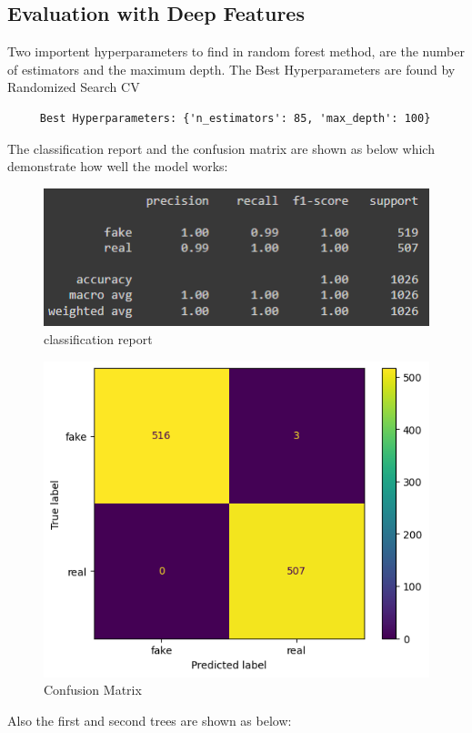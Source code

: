\documentclass{template}
\begin{document}
\subsection{Evaluation with Deep Features}
Two importent hyperparameters to find in random forest method, are the number of estimators and the maximum depth. The Best Hyperparameters are found by Randomized Search CV
\begin{verbatim}
     Best Hyperparameters: {'n_estimators': 85, 'max_depth': 100}
\end{verbatim}
The classification report and the confusion matrix are shown as below which demonstrate how well the model works:
\begin{figure}
\includegraphics[scale=0.7]{RF1.png}
\caption{classification report}
\label{fig:logo}
\end{figure}
\begin{figure}
\includegraphics[scale=0.7]{RF2.png}
\caption{ Confusion Matrix}
\label{fig:logo}
\end{figure}
Also the first and second trees are shown as below:
\end{document}
